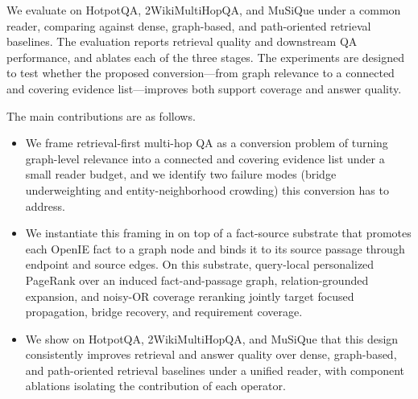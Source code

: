 We evaluate \methodname{} on HotpotQA, 2WikiMultiHopQA, and MuSiQue
under a common reader, comparing against dense, graph-based, and
path-oriented retrieval baselines. The evaluation reports retrieval
quality and downstream QA performance, and ablates each of the three
stages. The experiments are designed to test whether the proposed
conversion---from graph relevance to a connected and covering evidence
list---improves both support coverage and answer quality.

The main contributions are as follows.
\begin{itemize}
    \item We frame retrieval-first multi-hop QA as a conversion
    problem of turning graph-level relevance into a connected and
    covering evidence list under a small reader budget, and we
    identify two failure modes (bridge underweighting and
    entity-neighborhood crowding) this conversion has to address.
    \item We instantiate this framing in \methodname{} on top of a
    fact-source substrate that promotes each OpenIE fact to a graph
    node and binds it to its source passage through endpoint and
    source edges. On this substrate, query-local personalized
    PageRank over an induced fact-and-passage graph,
    relation-grounded expansion, and
    noisy-OR coverage reranking jointly target focused propagation,
    bridge recovery, and requirement coverage.
    \item We show on HotpotQA, 2WikiMultiHopQA, and MuSiQue that
    this design consistently improves retrieval and answer quality
    over dense, graph-based, and path-oriented retrieval baselines
    under a unified reader, with component ablations isolating the
    contribution of each operator.
\end{itemize}
